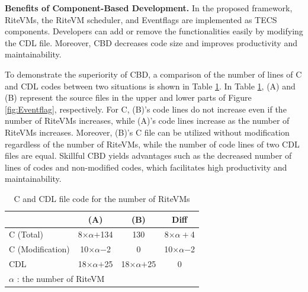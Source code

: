 \documentclass[conference]{IEEEtran/IEEEtran/IEEEtran}
\begin{document}
{\bf Benefits of Component-Based Development.}
In the proposed framework, RiteVMs, the RiteVM scheduler, and Eventflags are implemented as TECS components.
Developers can add or remove the functionalities easily by modifying the CDL file.
Moreover, CBD decreases code size and improves productivity and maintainability.

To demonstrate the superiority of CBD, a comparison of the number of lines of C and CDL codes between two situations is shown in Table \ref{tab:codesize}.
In Table \ref{tab:codesize}, (A) and (B) represent the source files in the upper and lower parts of Figure \ref{fig:Eventflag}, respectively. 
For C, (B)'s code lines do not increase even if the number of RiteVMs increases, while (A)'s code lines increase as the number of RiteVMs increases.
Moreover, (B)'s C file can be utilized without modification regardless of the number of RiteVMs, while the number of code lines of two CDL files are equal.
Skillful CBD yields advantages such as the decreased number of lines of codes and non-modified codes, which facilitates high productivity and maintainability.

\begin{table}[t]
    \centering
    \caption{C and CDL file code for the number of RiteVMs}
    \vspace{-2mm}
    {\tabcolsep=0.3cm
    \begin{tabular}{l||c|c|c}
                & (A)       & (B)     & Diff  \\ \hline
        C (Total)      & 8$\times$$\alpha$$+$134  & 130     & 8$\times$$\alpha+$4\\
        C (Modification)   & 10$\times\alpha$$-$2 & 0   &  10$\times\alpha$$-$2 \\
        CDL    & 18$\times$$\alpha$$+$25   & 18$\times$$\alpha$$+$25 & 0     \\
        \multicolumn{3}{l}{{\small $\alpha$} : {\scriptsize the number of RiteVM}}
        \vspace{-3mm}
    \end{tabular}
    }
          \vspace{-3mm}
    \label{tab:codesize}
\end{table}
\end{document}
